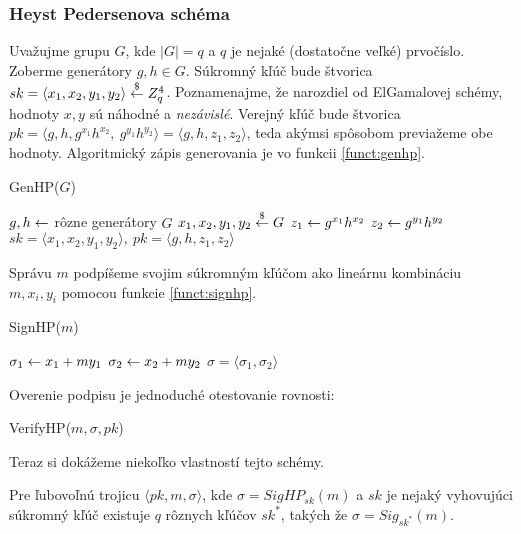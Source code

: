 \subsubsection{Heyst Pedersenova schéma}

Uvažujme grupu $G$, kde $|G| = q$ a $q$ je nejaké (dostatočne veľké) prvočíslo.
Zoberme generátory $g, h \in G$.
Súkromný kľúč bude štvorica  
$sk = \langle x_1, x_2, y_1, y_2 \rangle \overset{\$}{\leftarrow} Z_q^4$.
Poznamenajme, že narozdiel od ElGamalovej schémy, hodnoty $x,y$ sú
náhodné a \emph{nezávislé}.
Verejný kľúč bude štvorica 
$pk = \langle g,h, g^{x_1} h^{x_2},\ g^{y_1} h^{y_2} \rangle = 
    \langle g,h,z_1, z_2 \rangle$, teda akýmsi
spôsobom previažeme obe hodnoty. Algoritmický zápis generovania je vo
funkcii \ref{funct:genhp}.

\begin{function}[h!]
    \caption{GenHP($G$)}
    \label{funct:genhp}
    $g,h \leftarrow $ rôzne generátory $G$\;
    $x_1,x_2,y_1,y_2 \overset{\$}{\leftarrow} G$\;
    $z_1 \leftarrow g^{x_1} h^{x_2}$\;
    $z_2 \leftarrow g^{y_1} h^{y_2}$\;
    \Return $sk=\langle x_1,x_2,y_1,y_2 \rangle,\ 
        pk=\langle g,h,z_1,z_2 \rangle$\;
\end{function}

Správu $m$ podpíšeme svojim súkromným kľúčom ako lineárnu kombináciu
$m,x_i, y_i$ pomocou funkcie \ref{funct:signhp}.

\begin{function}[h!]
    \caption{SignHP($m$)}
    \label{funct:signhp}
    $\sigma_1 \leftarrow x_1 + m y_1$\;
    $\sigma_2 \leftarrow x_2 + m y_2$\;
    \Return $\sigma=\langle \sigma_1,\sigma_2 \rangle$\;
\end{function}

Overenie podpisu je jednoduché otestovanie
rovnosti:
\begin{function}[h!]
    \caption{VerifyHP($m,\sigma,pk$)}
\end{function}

Teraz si dokážeme niekoľko vlastností tejto schémy.

\begin{lema}
    Pre ľubovoľnú trojicu $\langle pk, m, \sigma \rangle$,
    kde $\sigma = SigHP_{sk}(m)$
    a $sk$ je nejaký vyhovujúci súkromný kľúč
    existuje $q$ rôznych kľúčov $sk^*$, takých že $\sigma = Sig_{sk^*}(m)$.
\end{lema}


